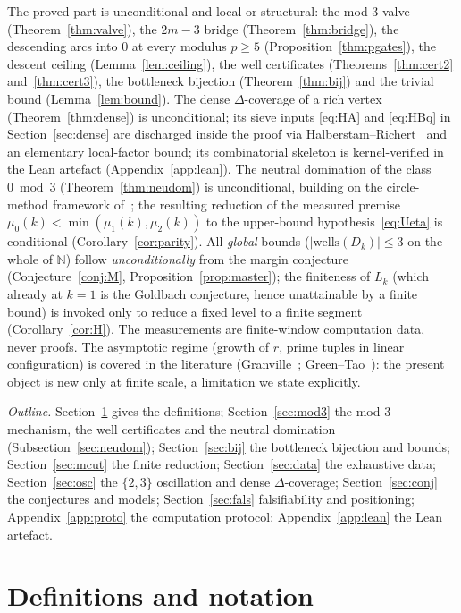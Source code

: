\documentclass[11pt]{article}
\theoremstyle{plain}
\theoremstyle{definition}
\newcommand{\N}{\mathbb{N}}
\newcommand{\rch}{r}
\newcommand{\Dk}{D_{k}}
\newcommand{\wells}{\mathrm{wells}}
\begin{document}
The proved part is unconditional and local or structural: the mod-3
valve (Theorem~\ref{thm:valve}), the $2m-3$ bridge
(Theorem~\ref{thm:bridge}), the descending arcs into $0$ at every
modulus $p \ge 5$ (Proposition~\ref{thm:pgates}), the descent ceiling
(Lemma~\ref{lem:ceiling}), the well certificates
(Theorems~\ref{thm:cert2} and~\ref{thm:cert3}), the bottleneck
bijection (Theorem~\ref{thm:bij}) and the trivial bound
(Lemma~\ref{lem:bound}). The dense $\Delta$-coverage of a rich
vertex (Theorem~\ref{thm:dense}) is unconditional; its sieve
inputs \eqref{eq:HA} and \eqref{eq:HBq} in Section~\ref{sec:dense} are
discharged inside the proof via Halberstam--Richert~\cite[Theorem~5.7]{hr}
and an elementary local-factor bound; its combinatorial skeleton is
kernel-verified in the Lean artefact (Appendix~\ref{app:lean}).
The neutral domination of the class $0 \bmod 3$
(Theorem~\ref{thm:neudom}) is unconditional, building on the
circle-method framework of~\cite{mv,vaughan}; the resulting reduction
of the measured premise $\mu_0(k) < \min(\mu_1(k),\mu_2(k))$ to the
upper-bound hypothesis~\eqref{eq:Ueta} is conditional
(Corollary~\ref{cor:parity}). All
\emph{global} bounds ($|\wells(\Dk)| \le 3$ on the whole of $\N$)
follow \emph{unconditionally} from the margin conjecture
(Conjecture~\ref{conj:M}, Proposition~\ref{prop:master}); the
finiteness of $L_k$ (which already at $k = 1$ is the Goldbach
conjecture, hence unattainable by a finite bound) is invoked only
to reduce a fixed level to a finite segment (Corollary~\ref{cor:H}).
The measurements are finite-window computation data, never proofs.
The asymptotic regime (growth of $\rch$, prime tuples in linear
configuration) is covered in the literature
(Granville~\cite{granville}; Green--Tao~\cite{greentao}): the
present object is new only at finite scale, a limitation we state
explicitly.

\noindent\emph{Outline.} Section~\ref{sec:defs} gives the
definitions;
Section~\ref{sec:mod3} the mod-3 mechanism, the well
certificates and the neutral domination
(Subsection~\ref{sec:neudom}); Section~\ref{sec:bij} the
bottleneck bijection and bounds; Section~\ref{sec:mcut} the finite
reduction; Section~\ref{sec:data} the exhaustive data;
Section~\ref{sec:osc} the $\{2,3\}$ oscillation and dense
$\Delta$-coverage; Section~\ref{sec:conj} the conjectures and
models; Section~\ref{sec:fals} falsifiability and positioning;
Appendix~\ref{app:proto} the computation protocol;
Appendix~\ref{app:lean} the Lean artefact.

\section{Definitions and notation}
\label{sec:defs}
\end{document}
